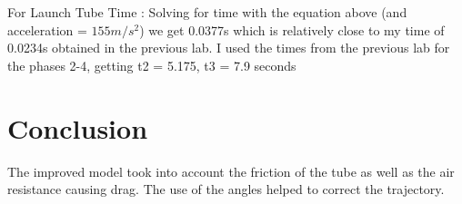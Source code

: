 \documentclass[a4paper,11pt]{article}
\begin{document}
    \begin{figure}[H]
    \end{figure}
    
    {}
    
    {For Launch Tube Time : Solving for time with the equation above (and acceleration = $155m/s^2$) we get 0.0377s which is relatively close to my time of 0.0234s obtained in the previous lab. I used the times from the previous lab for the phases 2-4, getting t2 = 5.175, t3 = 7.9 seconds}
    
    \section{Conclusion}
    {The improved model took into account the friction of the tube as well as the air resistance causing drag. The use of the angles helped to correct the trajectory.}
    
\end{document}
